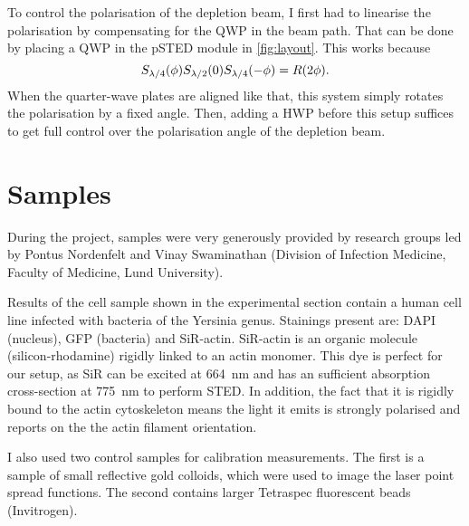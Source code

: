 To control the polarisation of the depletion beam, I first had to linearise the polarisation by compensating for the QWP in the beam path. That can be done by placing a QWP in the pSTED module in \autoref{fig:layout}. This works because 
\begin{equation}
	S_{\lambda/4}(\phi)S_{\lambda/2}(0)S_{\lambda/4}(-\phi) = R(2\phi).
\end{equation}
When the quarter-wave plates are aligned like that, this system simply rotates the polarisation by a fixed angle. Then, adding a HWP before this setup suffices to get full control over the polarisation angle of the depletion beam.

\section{Samples}
\label{sec:samples}

During the project, samples were very generously provided by research groups led by Pontus Nordenfelt and Vinay Swaminathan (Division of Infection Medicine, Faculty of Medicine, Lund University).

Results of the cell sample shown in the experimental section contain a human cell line infected with bacteria of the Yersinia genus. Stainings present are: DAPI (nucleus), GFP (bacteria) and SiR-actin. SiR-actin is an organic molecule (silicon-rhodamine) rigidly linked to an actin monomer. This dye is perfect for our setup, as SiR can be excited at 664~nm and has an sufficient absorption cross-section at 775~nm to perform STED. In addition, the fact that it is rigidly bound to the actin cytoskeleton means the light it emits is strongly polarised and reports on the the actin filament orientation.

I also used two control samples for calibration measurements. The first is a sample of small  reflective gold colloids, which were used to image the laser point spread functions. The second contains larger Tetraspec fluorescent beads (Invitrogen).